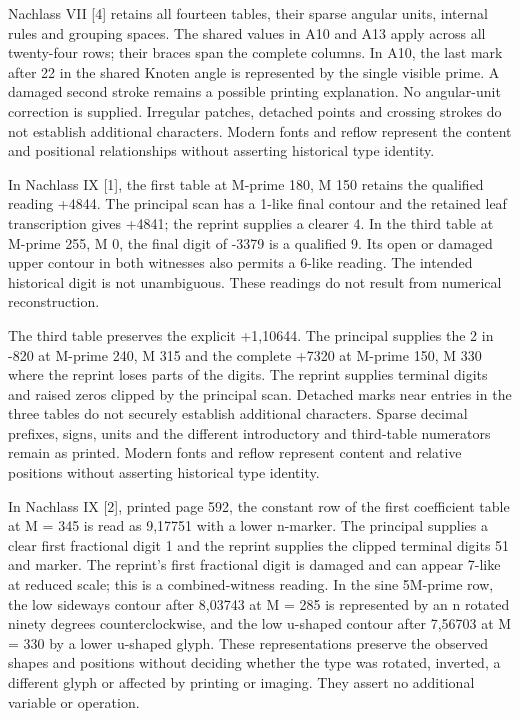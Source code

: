 Nachlass VII [4] retains all fourteen tables, their sparse angular units, internal rules and grouping spaces. The shared values in A10 and A13 apply across all twenty-four rows; their braces span the complete columns. In A10, the last mark after 22 in the shared Knoten angle is represented by the single visible prime. A damaged second stroke remains a possible printing explanation. No angular-unit correction is supplied. Irregular patches, detached points and crossing strokes do not establish additional characters. Modern fonts and reflow represent the content and positional relationships without asserting historical type identity.

In Nachlass IX [1], the first table at M-prime 180, M 150 retains the qualified reading +4844. The principal scan has a 1-like final contour and the retained leaf transcription gives +4841; the reprint supplies a clearer 4. In the third table at M-prime 255, M 0, the final digit of -3379 is a qualified 9. Its open or damaged upper contour in both witnesses also permits a 6-like reading. The intended historical digit is not unambiguous. These readings do not result from numerical reconstruction.

The third table preserves the explicit +1,10644. The principal supplies the 2 in -820 at M-prime 240, M 315 and the complete +7320 at M-prime 150, M 330 where the reprint loses parts of the digits. The reprint supplies terminal digits and raised zeros clipped by the principal scan. Detached marks near entries in the three tables do not securely establish additional characters. Sparse decimal prefixes, signs, units and the different introductory and third-table numerators remain as printed. Modern fonts and reflow represent content and relative positions without asserting historical type identity.

In Nachlass IX [2], printed page 592, the constant row of the first coefficient table at M = 345 is read as 9,17751 with a lower n-marker. The principal supplies a clear first fractional digit 1 and the reprint supplies the clipped terminal digits 51 and marker. The reprint's first fractional digit is damaged and can appear 7-like at reduced scale; this is a combined-witness reading. In the sine 5M-prime row, the low sideways contour after 8,03743 at M = 285 is represented by an n rotated ninety degrees counterclockwise, and the low u-shaped contour after 7,56703 at M = 330 by a lower u-shaped glyph. These representations preserve the observed shapes and positions without deciding whether the type was rotated, inverted, a different glyph or affected by printing or imaging. They assert no additional variable or operation.

